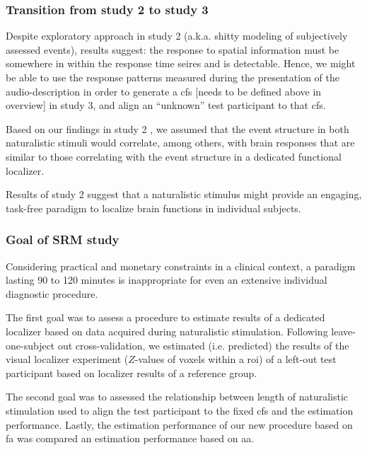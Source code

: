 

\subsubsection{Transition from study 2 to study 3}
%
Despite exploratory approach in study 2 (a.k.a. shitty modeling of subjectively
assessed events), results suggest:
%
the response to spatial information must be somewhere in within the response
time seires and is detectable.
%
Hence, we might be able to use the response patterns measured during the
presentation of the audio-description in order to generate a \ac{cfs} [needs to
be defined above in overview] in study 3, and align an ``unknown'' test
participant to that \ac{cfs}.

Based on our findings in study 2 \citep{haeusler2022processing}, we assumed that
the event structure in both naturalistic stimuli would correlate, among others,
with brain responses that are similar to those correlating with the event
structure in a dedicated functional localizer.

Results of study 2 suggest that a naturalistic stimulus might provide an
engaging, task-free paradigm to localize brain functions in individual subjects.



\subsubsection{Goal of SRM study}

Considering practical and monetary constraints in a clinical context, a paradigm
lasting 90 to 120 minutes is inappropriate for even an extensive individual
diagnostic procedure.

The first goal was to assess a procedure to estimate results of a dedicated
localizer \citep{sengupta2016extension} based on data acquired during
naturalistic stimulation.
%
Following leave-one-subject out cross-validation, we estimated (i.e. predicted)
the results of the visual localizer experiment ($Z$-values of voxels within a
\ac{roi}) of a left-out test participant based on localizer results of a
reference group.

The second goal was to assessed the relationship between length of
naturalistic stimulation used to align the test participant to the fixed
\ac{cfs} and the estimation performance.
%
Lastly, the estimation performance of our new procedure based on \ac{fa} was
compared an estimation performance based on \ac{aa}.


